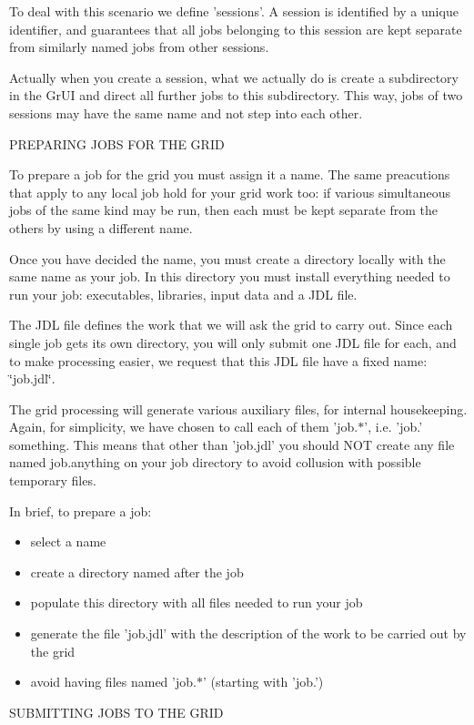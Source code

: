 To deal with this scenario we define 'sessions'. A session is identified by a unique identifier, and guarantees that all jobs belonging to this session are kept separate from similarly named jobs from other sessions.

Actually when you create a session, what we actually do is create a subdirectory in the Gr\-UI and direct all further jobs to this subdirectory. This way, jobs of two sessions may have the same name and not step into each other.

PREPARING JOBS FOR THE GRID

To prepare a job for the grid you must assign it a name. The same preacutions that apply to any local job hold for your grid work too: if various simultaneous jobs of the same kind may be run, then each must be kept separate from the others by using a different name.

Once you have decided the name, you must create a directory locally with the same name as your job. In this directory you must install everything needed to run your job: executables, libraries, input data and a JDL file.

The JDL file defines the work that we will ask the grid to carry out. Since each single job gets its own directory, you will only submit one JDL file for each, and to make processing easier, we request that this JDL file have a fixed name: \char`\"{}job.jdl\char`\"{}.

The grid processing will generate various auxiliary files, for internal housekeeping. Again, for simplicity, we have chosen to call each of them 'job.$\ast$', i.e. 'job.' something. This means that other than 'job.jdl' you should NOT create any file named job.anything on your job directory to avoid collusion with possible temporary files.

In brief, to prepare a job:\begin{itemize}
\item select a name\item create a directory named after the job\item populate this directory with all files needed to run your job\item generate the file 'job.jdl' with the description of the work to be carried out by the grid\item avoid having files named 'job.$\ast$' (starting with 'job.')\end{itemize}


SUBMITTING JOBS TO THE GRID

